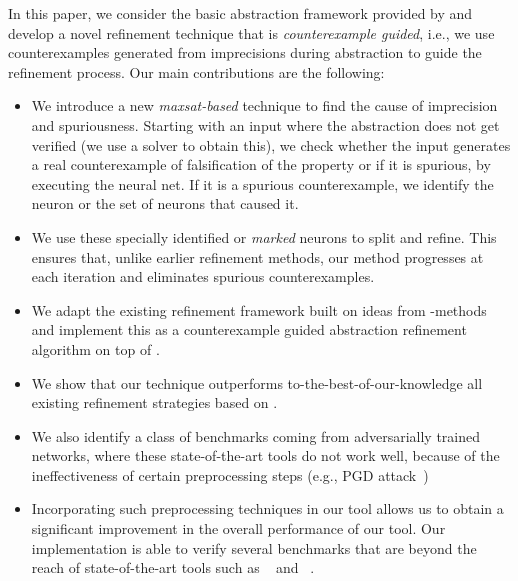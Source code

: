In this paper, we consider the basic abstraction framework provided by \deeppoly{} and develop a novel refinement technique that is {\em counterexample guided}, i.e., we use counterexamples generated from imprecisions during abstraction to guide the refinement process. Our main contributions are the following:
\begin{itemize}
\item We introduce a new {\em maxsat-based} technique to find the cause of imprecision and spuriousness. Starting with an input where the abstraction does not get verified (we use a \milp{} solver to obtain this), we check whether the input generates a real counterexample of falsification of the property or if it is spurious, by executing the neural net. If it is a spurious counterexample, we identify the neuron or the set of neurons that caused it.  
\item We use these specially identified or {\em marked} neurons to split and refine. This ensures that, unlike earlier refinement methods, our method progresses at each iteration and eliminates spurious counterexamples.
\item We adapt the existing refinement framework built on ideas from \milp{}-methods and implement this as a counterexample guided abstraction refinement algorithm on top of \deeppoly{}.
\item We show that our technique outperforms to-the-best-of-our-knowledge all existing refinement strategies based on \deeppoly{}.
\item   We also identify a class of benchmarks coming from adversarially trained networks, where these state-of-the-art tools do not work well, because of the ineffectiveness of certain preprocessing steps (e.g., PGD attack~\cite{dong2018boosting})
\item Incorporating such preprocessing techniques in our tool allows us to obtain a significant improvement in the overall performance of our tool.
 Our implementation is able to verify several benchmarks that are beyond the reach of state-of-the-art tools such as \alphabeta{}~\cite{alphabetacrown} and \ovaltool{}~\cite{bunel2020branch}.

\end{itemize}

